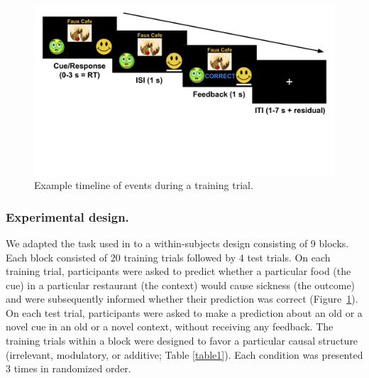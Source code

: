 \documentclass[10pt,letterpaper]{article}
\begin{document}
\begin{figure}[ht]
\begin{center}
\includegraphics[scale=0.355,  trim = 20 150 0 20]{task-design.pdf}
\end{center}
\vspace{-1em}
\caption{Example timeline of events during a training trial. } 
\label{task-design}
\end{figure}

\subsubsection{Experimental design.} 

We adapted the task used in  to a within-subjects design consisting of 9 blocks. Each block consisted of 20 training trials followed by 4 test trials. On each training trial, participants were asked to predict whether a particular food (the cue) in a particular restaurant (the context) would cause sickness (the outcome) and were subsequently informed whether their prediction was correct (Figure~\ref{task-design}). On each test trial, participants were asked to make a prediction about an old or a novel cue in an old or a novel context, without receiving any feedback. The training trials within a block were designed to favor a particular causal structure (irrelevant, modulatory, or additive; Table \ref{table1}). Each condition was presented 3 times in randomized order.
\\
\end{document}

